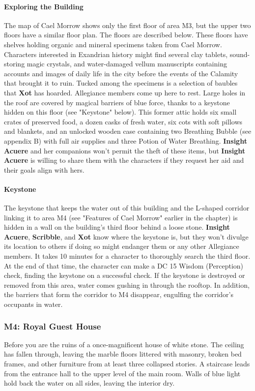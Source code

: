 \documentclass[10pt,a4,twoside,twocolumn,openany,nodeprecatedcode]{dndbook}
\begin{document}
\paragraph{Exploring the Building}
The map of Cael Morrow shows only the first floor of area M3, but the upper two floors have a similar floor plan. The floors are described below.
{{These floors have shelves holding organic and mineral specimens taken from Cael Morrow. Characters interested in Exandrian history might find several clay tablets, sound-storing magic crystals, and water-damaged vellum manuscripts containing accounts and images of daily life in the city before the events of the Calamity that brought it to ruin. Tucked among the specimens is a selection of baubles that \textbf{Xot} has hoarded.}}
{{Allegiance members come up here to rest. Large holes in the roof are covered by magical barriers of blue force, thanks to a keystone hidden on this floor (see "Keystone" below). This former attic holds six small crates of preserved food, a dozen casks of fresh water, six cots with soft pillows and blankets, and an unlocked wooden case containing two Breathing Bubble (see appendix B) with full air supplies and three Potion of Water Breathing. \textbf{Insight Acuere} and her companions won't permit the theft of these items, but \textbf{Insight Acuere} is willing to share them with the characters if they request her aid and their goals align with hers.}}
\paragraph{Keystone}
The keystone that keeps the water out of this building and the L-shaped corridor linking it to area M4 (see "Features of Cael Morrow" earlier in the chapter) is hidden in a wall on the building's third floor behind a loose stone. \textbf{Insight Acuere}, \textbf{Scribble}, and \textbf{Xot} know where the keystone is, but they won't divulge its location to others if doing so might endanger them or any other Allegiance members.
It takes 10 minutes for a character to thoroughly search the third floor. At the end of that time, the character can make a DC 15 Wisdom (Perception) check, finding the keystone on a successful check. If the keystone is destroyed or removed from this area, water comes gushing in through the rooftop. In addition, the barriers that form the corridor to M4 disappear, engulfing the corridor's occupants in water.
\subsubsection{M4: Royal Guest House}
\begin{DndReadAloud}{}
Before you are the ruins of a once-magnificent house of white stone. The ceiling has fallen through, leaving the marble floors littered with masonry, broken bed frames, and other furniture from at least three collapsed stories. A staircase leads from the entrance hall to the upper level of the main room. Walls of blue light hold back the water on all sides, leaving the interior dry.
\end{DndReadAloud}
\end{document}

